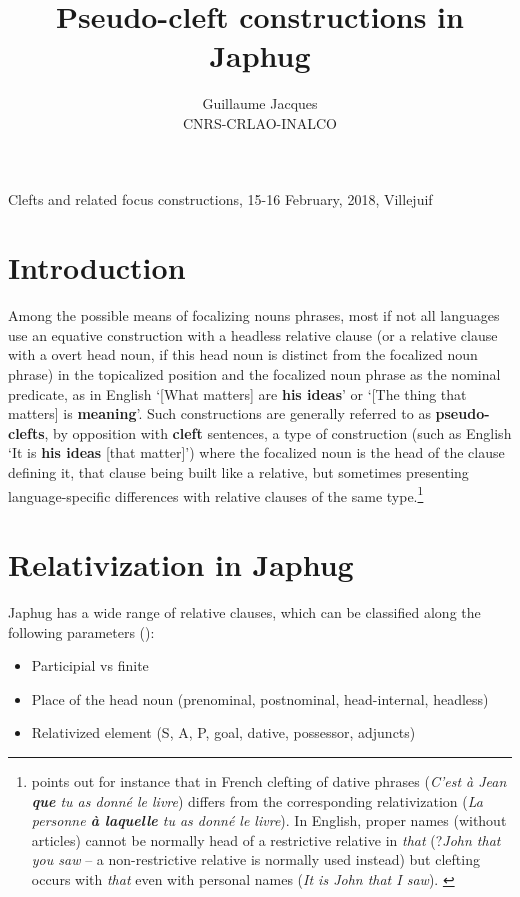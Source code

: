 \documentclass[oneside,a4paper,11pt]{article}
\begin{document}
 
\title{Pseudo-cleft constructions in Japhug}
\author{Guillaume Jacques\\ CNRS-CRLAO-INALCO}
\date{}
\maketitle
Clefts and related focus constructions, 15-16 February, 2018, Villejuif
\section*{Introduction}
Among the possible means of focalizing nouns phrases, most if not all languages use an equative construction with a headless relative clause (or a relative clause with a overt head noun, if this head noun is distinct from the focalized noun phrase) in the topicalized position and the focalized noun phrase as the nominal predicate, as in English `[What matters] are \textbf{his ideas}' or `[The thing that matters] is \textbf{meaning}'.
Such constructions are generally referred to as \textbf{pseudo-clefts}, by opposition with \textbf{cleft} sentences, a type of construction (such as English `It is \textbf{his ideas} [that matter]') where the focalized noun is the head of the clause defining it, that clause being built like a relative, but sometimes presenting language-specific differences with relative clauses of the same type.\footnote{
\citet[123-4]{creissels06sgit2} points out for instance that in French clefting of dative phrases (\textit{C'est à Jean \textbf{que} tu as donné le livre}) differs from the corresponding relativization (\textit{La personne \textbf{à laquelle} tu as donné le livre}). In English, proper names (without articles) cannot be normally head of a restrictive relative in \textit{that} (?\textit{John that you saw} -- a non-restrictive relative is normally used instead) but clefting occurs with \textit{that} even with personal names (\textit{It is John that I saw}). \label{sec:cleft.vs.relatives}
}
 

\section{Relativization in Japhug} \label{sec:relatives}
Japhug has a wide range of relative clauses, which can be classified along the following parameters (\citealt{jacques16relatives}):

\begin{itemize}
\item Participial vs finite
\item Place of the head noun (prenominal, postnominal, head-internal, headless)
\item Relativized element (S, A, P, goal, dative, possessor, adjuncts)
\end{itemize}
 
\end{document}
